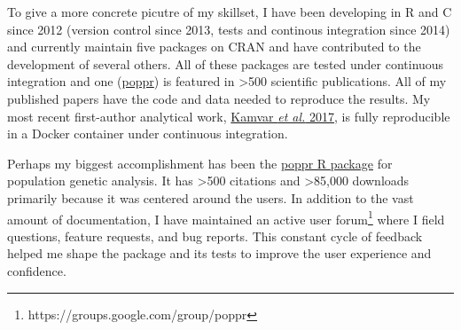 To give a more concrete picutre of my skillset, I have been
developing in R and C since 2012 (version control since 2013, tests and
continous integration since 2014) and currently maintain five packages on CRAN
and have contributed to the development of several others. All of these
packages are tested under continuous integration and one
(\href{https://grunwaldlab.github.io/poppr}{poppr}) is featured in
\textgreater500 scientific publications. All of my published papers have the
code and data needed to reproduce the results. My most recent first-author
analytical work, \href{https://peerj.com/articles/4152/}{Kamvar \textit{et al.}
2017}, is fully reproducible in a Docker container under continuous
integration. 

\vspace{1ex}

Perhaps my biggest accomplishment has been the
\href{https://grunwaldlab.github.io/poppr}{poppr R package} for population
genetic analysis. It has \textgreater500 citations and \textgreater85,000
downloads primarily because it was centered around the users. In addition to the
vast amount of documentation, I have maintained an active user 
forum\footnote{https://groups.google.com/group/poppr} where I field questions,
feature requests, and bug reports. This constant cycle of feedback helped me
shape the package and its tests to improve the user experience and confidence.

\vspace{1ex}












